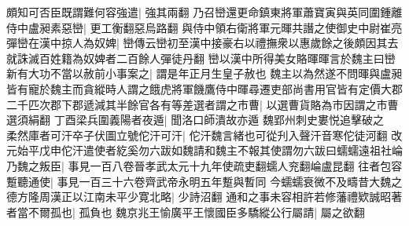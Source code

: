 頗知可否臣既謂難何容強遣|{
	強其兩翻}
乃召巒還更命鎮東將軍蕭寶寅與英同圍鍾離侍中盧昶素惡巒|{
	更工衡翻惡烏路翻}
與侍中領右衛將軍元暉共譖之使御史中尉崔亮彈巒在漢中掠人為奴婢|{
	巒傳云巒初至漢中接豪右以禮撫衆以惠歲餘之後頗因其去就誅滅百姓籍為奴婢者二百餘人彈徒丹翻}
巒以漢中所得美女賂暉暉言於魏主曰巒新有大功不當以赦前小事案之|{
	謂是年正月生皇子赦也}
魏主以為然遂不問暉與盧昶皆有寵於魏主而貪縱時人謂之餓虎將軍饑鷹侍中暉尋遷吏部尚書用官皆有定價大郡二千匹次郡下郡遞減其半餘官各有等差選者謂之市曹|{
	以選曹貨賂為市因謂之市曹選須絹翻}
丁酉梁兵圍義陽者夜遁|{
	聞洛口師潰故亦遁}
魏郢州刺史婁悦追擊破之　柔然庫者可汗卒子伏圖立號佗汗可汗|{
	佗汗魏言緒也可從刋入聲汗音寒佗徒河翻}
改元始平戊申佗汗遣使者紇奚勿六跋如魏請和魏主不報其使謂勿六跋曰蠕蠕遠祖社崘乃魏之叛臣|{
	事見一百八卷晉孝武太元十九年使疏吏翻蠕人兖翻崘盧昆翻}
往者包容蹔聽通使|{
	事見一百三十六卷齊武帝永明五年蹔與暫同}
今蠕蠕衰微不及疇昔大魏之德方隆周漢正以江南未平少寛北略|{
	少詩沼翻}
通和之事未容相許若修藩禮欵誠昭著者當不爾孤也|{
	孤負也}
魏京兆王愉廣平王懷國臣多驕縱公行屬請|{
	屬之欲翻}


